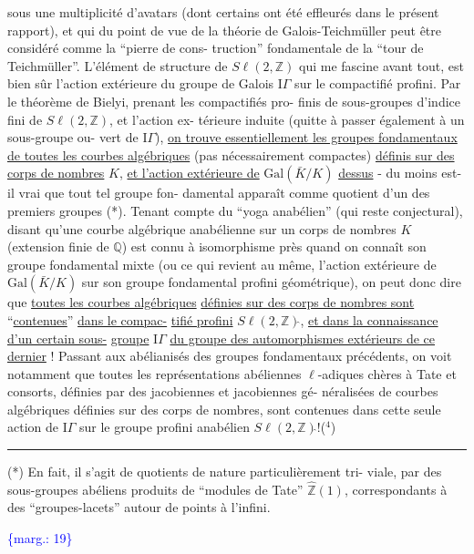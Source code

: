 \documentclass[11pt]{article}
\newcommand{\scanpage}[1]{\par\bigskip\noindent{\small\sffamily[scan #1]}\par}
\newcommand{\mspage}[1]{{\small\sffamily[p.\,#1]}}
\newcommand{\margin}[1]{\textcolor{blue}{\{\textsf{marg.:} #1\}}}
\newcommand{\uline}[1]{\underline{#1}}
\begin{document}
sous une multiplicité d'avatars (dont certains ont été effleurés
dans le présent rapport), et qui du point de vue de la théorie de
Galois-Teichmüller peut être considéré comme la ``pierre de cons-%
truction'' fondamentale de la ``tour de Teichmüller''. L'élément de
structure de $S\ell(2,\mathbb{Z})$ qui me fascine avant tout, est bien sûr
l'action extérieure du groupe de Galois $\mathrm{I}\!\Gamma$ sur le compactifié
profini. Par le théorème de Bielyi, prenant les compactifiés pro-%
finis de sous-groupes d'indice fini de $S\ell(2,\mathbb{Z})$, et l'action ex-%
térieure induite (quitte à passer également à un sous-groupe ou-%
vert de $\mathrm{I}\!\Gamma$), \uline{on trouve essentiellement les groupes fondamentaux}
\uline{de toutes les courbes algébriques} (pas nécessairement compactes)
\uline{définis sur des corps de nombres} $K$, \uline{et l'action extérieure de}
$\mathrm{Gal}(\bar{K}/K)$ \uline{dessus} - du moins est-il vrai que tout tel groupe fon-%
damental apparaît comme quotient d'un des premiers groupes (*).
Tenant compte du ``yoga anabélien'' (qui reste conjectural), disant
qu'une courbe algébrique anabélienne sur un corps de nombres $K$
(extension finie de $\mathbb{Q}$) est connu à isomorphisme près quand on
connaît son groupe fondamental mixte (ou ce qui revient au même,
l'action extérieure de $\mathrm{Gal}(\bar{K}/K)$ sur son groupe fondamental profini
géométrique), on peut donc dire que \uline{toutes les courbes algébriques}
\uline{définies sur des corps de nombres sont} ``\uline{contenues}'' \uline{dans le compac-}%
\uline{tifié profini} $S\ell(2,\mathbb{Z})\hat{}$, \uline{et dans la connaissance d'un certain sous-}%
\uline{groupe} $\mathrm{I}\!\Gamma$ \uline{du groupe des automorphismes extérieurs de ce dernier} !
Passant aux abélianisés des groupes fondamentaux précédents, on voit
notamment que toutes les représentations abéliennes $\ell$-adiques chères
à Tate et consorts, définies par des jacobiennes et jacobiennes gé-%
néralisées de courbes algébriques définies sur des corps de nombres,
sont contenues dans cette seule action de $\mathrm{I}\!\Gamma$ sur le groupe profini
anabélien $S\ell(2,\mathbb{Z})\hat{}$!($^{4}$)

\rule{5cm}{0.4pt}

(*) En fait, il s'agit de quotients de nature particulièrement tri-%
viale, par des sous-groupes abéliens produits de ``modules de Tate''
$\hat{\mathbb{Z}}(1)$, correspondants à des ``groupes-lacets'' autour de points à l'infini.

\margin{19}

\clearpage
\scanpage{119/20}
\mspage{18}
\end{document}
